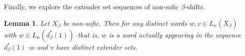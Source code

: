 \documentclass{amsart}
\newtheorem{lemma}[theorem]{Lemma}
\theoremstyle{definition}
\numberwithin{equation}{section}
\begin{document}



Finally, we explore the extender set sequences of non-sofic $\beta$-shifts.
\begin{lemma}\label{wordsind}
Let $X_\beta$ be non-sofic. Then for any distinct words $w, v \in L_n(X_\beta)$ with $w \in L_n(d_\beta^*(1))$--that is, $w$ is a word actually appearing in the sequence $d_\beta^*(1)$--$w$ and $v$ have distinct extender sets.
\end{lemma}
\end{document}
